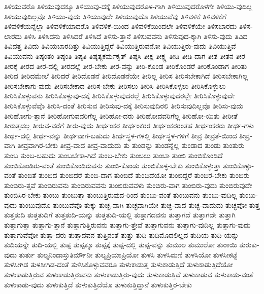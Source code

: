 {ತಿಳಿಯುವರೊ
ತಿಳಿಯುವುದಕ್ಕೂ
ತಿಳಿಯುವು-ದಕ್ಕೆ
ತಿಳಿಯುವುದರೊಳ-ಗಾಗಿ
ತಿಳಿಯುವುದರೊಳಗೇ
ತಿಳಿಯು-ವುದಿಲ್ಲ
ತಿಳಿಯುವುದಿಲ್ಲವೊ
ತಿಳಿಯು-ವುದು
ತಿಳಿಯುವುದೇ
ತಿಳಿಯುವುದೊ
ತಿಳಿಯುವೆವು
ತಿಳಿವಳಿಕೆ
ತಿಳಿವಳಿಕೆಗೆ
ತಿಳಿವಳಿಕೆಯನ್ನೆಲ್ಲಾ
ತಿಳಿವಳಿಕೆಯಾದರೊ
ತಿಳಿವಳಿಕೆ-ಯಿಂದ
ತಿಳಿವಳಿಕೆಯಿಂದಲೇ
ತಿಳಿವಳಿಕೆಯೇ
ತಿಳಿಸಬಾರದು
ತಿಳಿಸ-ಲಾರದು
ತಿಳಿಸಿ
ತಿಳಿಸಿದನು
ತಿಳಿಸಿದರೆ
ತಿಳಿಸಿದೆ
ತಿಳಿಸು-ತ್ತಾನೆ
ತಿಳಿಸುವವನು
ತಿಳಿಸುವುದ-ಕ್ಕಾಗಿ
ತಿಳಿಸು-ವುದು
ತಿವಿದ
ತಿವಿದತ್ತ
ತಿವಿದು
ತಿವಿಯಬಾರದಿತ್ತು
ತಿವಿಯುತ್ತಿದ್ದರೆ
ತಿವಿಯುತ್ತಿರುವನೋ
ತಿವಿಯುತ್ತಿರು-ವುದು
ತಿವಿಯುತ್ತಿವೆ
ತಿವಿಯುವನು
ತಿಷ್ಠಂತಂ
ತಿಷ್ಠಂತಿ
ತಿಷ್ಠತಿ
ತಿಷ್ಠತ್ಯಕರ್ಮಕೃತ್
ತಿಷ್ಠಸಿ
ತೀಕ್ಷ
ತೀಕ್ಷ್ಣ
ತೀಡಿ
ತೀಡಿ-ದಾಗ
ತೀತ
ತೀತನ
ತೀರ
ತೀರಕ್ಕೆ
ತೀರದ
ತೀರ-ದಲ್ಲಿ
ತೀರದಲ್ಲೆ
ತೀರ-ಬೇಕು
ತೀರ-ವನ್ನು
ತೀರಿ-ಕೊಂಡ
ತೀರಿಕೊಂಡರೆ
ತೀರಿಕೊಂಡಾಗ
ತೀರಿತು
ತೀರಿದ
ತೀರಿದಮೇಲೆ
ತೀರಿದರೆ
ತೀರಿದೊಡನೆ
ತೀರಿದೊಡನೆಯೇ
ತೀರಿಲ್ಲ
ತೀರಿಸ
ತೀರಿಸಬೇಕಾಗಿದೆ
ತೀರಿಸಬೇಕಾಗಿಲ್ಲ
ತೀರಿಸಬೇಕಾಗು-ವುದು
ತೀರಿಸಬೇಕಾದ
ತೀರಿಸ-ಬೇಕು
ತೀರಿಸಲು
ತೀರಿಸಿ
ತೀರಿಸಿಕೊಳ್ಳಲು
ತೀರಿಸಿಕೊಳ್ಳುಲು
ತೀರಿಸಿಕೊಳ್ಳುವನು
ತೀರಿಸಿಕೊಳ್ಳುವು-ದಕ್ಕೆ
ತೀರಿಸಿಕೊಳ್ಳುವುದರಲ್ಲೆ
ತೀರಿಸಿಕೊಳ್ಳುವುದರಲ್ಲೇ
ತೀರಿಸಿಕೊಳ್ಳುವುದೇ
ತೀರಿಸಿಕೊಳ್ಳುವೆವೊ
ತೀರಿಸಿ-ದಂತೆ
ತೀರಿಸುವ
ತೀರಿಸುವು-ದಕ್ಕೆ
ತೀರಿಸುವುದಿರಲಿ
ತೀರಿಸುವುದಿಲ್ಲವೊ
ತೀರಿಸು-ವುದು
ತೀರಿಹೋಗು-ತ್ತಾನೆ
ತೀರಿಹೋಗುವವರಿಗೆಲ್ಲ
ತೀರಿಹೋ-ದರು
ತೀರಿಹೋದವರಿಗೆಲ್ಲ
ತೀರಿಹೋ-ಯಿತು
ತೀರೀತೆ
ತೀರುತ್ತದಲ್ಲ
ತೀರುವ-ವರೆಗೆ
ತೀರು-ವುದು
ತೀರ್ಥಂಕರ
ತೀರ್ಥಂಕರರ
ತೀರ್ಥಂಕರರಂತಹ
ತೀರ್ಥಂಕರರು
ತೀರ್ಥ-ಗಳು
ತೀರ್ಥ-ದಲ್ಲಿ
ತೀರ್ಥ-ವನ್ನು
ತೀರ್ಥವಾಗ-ಬಹುದು
ತೀರ್ಥಸ್ಥಳ-ಗಳಲ್ಲಿ
ತೀರ್ಥಸ್ಥಳ-ಗಳಿಗೆ
ತೀವ್ರ
ತೀವ್ರತೆ-ಯಿಂದ
ತೀವ್ರ-ವಾಗಿ
ತೀವ್ರವಾಗಿರ-ಬೇಕು
ತೀವ್ರ-ವಾದ
ತೀವ್ರ-ವಾದುದು
ತು
ತುಂಡನ್ನು
ತುಂಡನ್ನೆಲ್ಲ
ತುಂಡಾದ
ತುಂಡು
ತುಂತುರು
ತುಂಬ
ತುಂಬ-ಬಹುದು
ತುಂಬಬೇಕಾ-ಗಿದೆ
ತುಂಬ-ಬೇಕು
ತುಂಬಲು
ತುಂಬಾ
ತುಂಬಿ
ತುಂಬಿಕೊಂಡಿದೆ
ತುಂಬಿಕೊಂಡಿರು-ವಂತೆ
ತುಂಬಿಕೊಂಡಿರುವನು
ತುಂಬಿ-ಕೊಂಡು
ತುಂಬಿಕೊಳ್ಳ-ಬೇಕು
ತುಂಬಿಕೊಳ್ಳುತ್ತಾ
ತುಂಬಿಕೊಳ್ಳು-ವಂತೆ
ತುಂಬಿತೆ
ತುಂಬಿದ
ತುಂಬಿದರೆ
ತುಂಬಿ-ದಾಗ
ತುಂಬಿದೆ
ತುಂಬಿದೆಯೋ
ತುಂಬಿದ್ದರೆ
ತುಂಬಿರ-ಬೇಕು
ತುಂಬಿರು
ತುಂಬಿರು-ತ್ತವೆ
ತುಂಬಿರುವನು
ತುಂಬಿರುವವನು
ತುಂಬಿರುವವಳು
ತುಂಬಿರು-ವಾಗ
ತುಂಬಿರು-ವುದು
ತುಂಬಿರುವುದೇ
ತುಂಬಿಸಿರ-ಬೇಕು
ತುಂಬು
ತುಂಬುತ್ತಾ
ತುಂಬುತ್ತಿರುವುದ-ರಿಂದ
ತುಂಬು-ವಂತೆ
ತುಂಬುವನು
ತುಂಬು-ವುದಿಲ್ಲ
ತುಂಬು-ವುದು
ತುಂಬುವುದೊ
ತುಂಬುವೆವೊ
ತುಕ್ಕು
ತುಚ್ಛ-ವಾಗಿ
ತುಚ್ಛವಾಗಿಯೇ
ತುಚ್ಛ-ವಾದ
ತುಚ್ಛ-ವಾದುದು
ತುಚ್ಛವೋ
ತುತ್ತ
ತುತ್ತತುದಿ
ತುತ್ತತುದಿಗೆ
ತುತ್ತತುದಿ-ಯನ್ನು
ತುತ್ತತುದಿ-ಯಲ್ಲಿ
ತುತ್ತಾಗದವನು
ತುತ್ತಾಗದೆ
ತುತ್ತಾಗದೇ
ತುತ್ತಾಗಿ
ತುತ್ತಾಗುತ್ತಾ
ತುತ್ತಾಗು-ತ್ತಾನೆ
ತುತ್ತಾಗುತ್ತಿರುವನು
ತುತ್ತಾಗು-ತ್ತೇವೆ
ತುತ್ತಾಗುವನು
ತುತ್ತಾಗು-ವುದಿಲ್ಲ
ತುತ್ತಾಗು-ವುದು
ತುತ್ತಾಗುವೆವೋ
ತುತ್ತಾ-ದರು
ತುತ್ತಾದವನ
ತುತ್ತಿನಂತೆ
ತುತ್ತು
ತುದಿ
ತುದಿಮೊದಲಿಲ್ಲದ
ತುದಿಯ
ತುದಿ-ಯನ್ನು
ತುದಿಯನ್ನೇ
ತುದಿ-ಯಲ್ಲಿ
ತುಪ್ಪ
ತುಪ್ಪಕ್ಕೂ
ತುಪ್ಪಕ್ಕೆ
ತುಪ್ಪ-ದಲ್ಲಿ
ತುಪ್ಪ-ವನ್ನು
ತುಮುಲ
ತುಮುಲೋ
ತುರಾಯಿ
ತುರುಕು-ವುದು
ತುರ್ತು
ತುಲ್ಯನಿಂದಾಸ್ತುತಿರ್ಮೌನೀ
ತುಲ್ಯಪ್ರಿಯಾಪ್ರಿಯೋ
ತುಳಸಿ
ತುಳಸಿಮಣಿ
ತುಳಸಿಯೋ
ತುಳಸೀಕಟ್ಟೆ
ತುಳಸೀಗಿಡ
ತುಳಸೀಗಿಡ-ದಂತೆ
ತುಳಿಸಿಕೊಳ್ಳುವವರೂ
ತುಳುಕಾಡುತ್ತ
ತುಳುಕಾಡುತ್ತಿದೆ
ತುಳುಕಾಡುತ್ತಿದೆಯೋ
ತುಳುಕಾಡುತ್ತಿರುವ
ತುಳುಕಾಡುತ್ತಿರುವನು
ತುಳುಕಾಡುತ್ತಿರು-ವುದು
ತುಳುಕಾಡುತ್ತಿವೆ
ತುಳುಕಾಡುವ
ತುಳುಕಾಡು-ವಂತೆ
ತುಳುಕಾಡು-ವುದು
ತುಳುಕುತ್ತಿದೆ
ತುಳುಕುತ್ತಿದೆಯೊ
ತುಳುಕುತ್ತಿದ್ದಾನೆ
ತುಳುಕುತ್ತಿರ-ಬೇಕು
}
